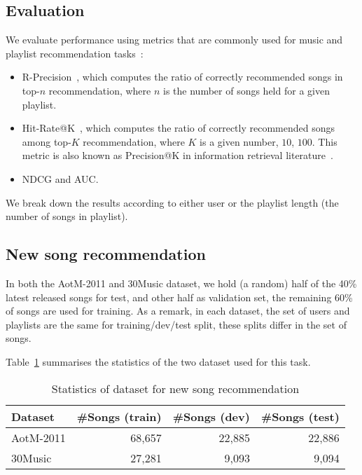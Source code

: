 \subsection{Evaluation}
We evaluate performance using metrics that are commonly used for music and playlist recommendation 
tasks~\cite{schedl2017,hariri2012context,jannach2015beyond}:
\begin{itemize}
\item R-Precision~\cite{manning2008introIR}, which computes the ratio of correctly recommended songs in top-$n$ recommendation, 
      where $n$ is the number of songs held for a given playlist.
\item Hit-Rate@K~\cite{hariri2012context}, which computes the ratio of correctly recommended songs among top-$K$ recommendation, 
      where $K$ is a given number, \eg $10$, $100$. 
      This metric is also known as Precision@K in information retrieval literature~\cite{manning2008introIR}.
\item NDCG and AUC.
\end{itemize}
We break down the results according to either user or the playlist length (\ie the number of songs in playlist).


\subsection{New song recommendation}
\label{ssec:newsongrec}

In both the AotM-2011 and 30Music dataset, we hold (a random) half of the 40\% latest released songs for test,
and other half as validation set, the remaining 60\% of songs are used for training.
As a remark, in each dataset, the set of users and playlists are the same for training/dev/test split,
these splits differ in the set of songs.

Table~\ref{tab:stats_newsongrec} summarises the statistics of the two dataset used for this task.

\begin{table}[!h]
\centering
\caption{Statistics of dataset for new song recommendation}
\label{tab:stats_newsongrec}
\small
\begin{tabular}{l|rrr}
\toprule
Dataset   & \#Songs (train) & \#Songs (dev) & \#Songs (test) \\
\midrule
AotM-2011 & 68,657          & 22,885        & 22,886 \\
30Music   & 27,281          & 9,093         & 9,094  \\
\bottomrule
\end{tabular}
\end{table}

